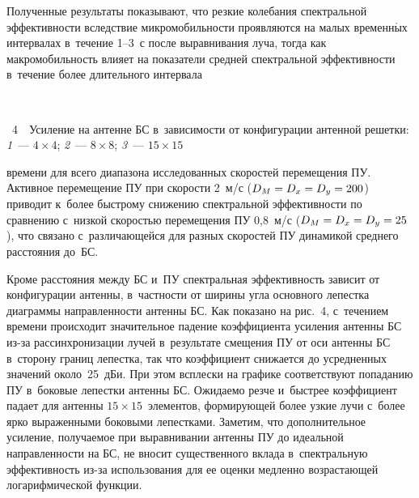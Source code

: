 \begin{multicols}{2}
  Полученные результаты показывают, что резкие колебания спектральной 
эффективности вследствие микромобильности проявляются на малых 
временн$\acute{\mbox{ы}}$х интервалах в~течение 1--3~с после выравнивания 
луча, тогда как макромобильность влияет на показатели средней спектральной 
эф\-фек\-тив\-ности в~течение более длительного интервала\linebreak\vspace*{-10pt}

{ \begin{center}  %
 \vspace*{-3pt}
    \mbox{%
\epsfxsize=77.21mm 
}

\end{center}



\noindent
{{\figurename~4}\ \ \small{Усиление на антенне БС в~зависимости от конфигурации антенной решетки: 
\textit{1}~--- $4\times 4$; \textit{2}~--- $8\times 8$; \textit{3}~--- $15\times 15$
}}}

\vspace*{6pt}

 
  
  \noindent
   времени для всего 
диапазона исследованных скоростей перемещения ПУ. Активное перемещение 
ПУ при скорости 2~м/с ($D_M\hm= D_x\hm= D_y\hm=200$) приводит к~более 
быстрому снижению спект\-раль\-ной эф\-фек\-тив\-ности по срав\-не\-нию с~низ\-кой 
ско\-ростью перемещения ПУ 0,8~м/с ($D_M\hm= D_x\hm= D_y\hm= 25$), что 
связано с~раз\-ли\-ча\-ющей\-ся для раз\-ных скоростей ПУ динамикой сред\-не\-го 
рас\-сто\-яния до~БС.
  

  
  Кроме расстояния между БС и~ПУ спектральная эффективность зависит от 
конфигурации антенны, в~частности от ширины угла основного лепестка 
диаграммы направленности антенны БС. Как показано на рис.~4, с~течением 
времени происходит значительное падение коэффициента усиления антенны БС 
из-за рассинхронизации лучей в~результате смещения ПУ от оси антенны БС 
в~сторону границ лепестка, так что коэффициент снижается до усредненных 
значений около~25~дБи. При этом всплески на графике соответствуют 
попаданию ПУ в~боковые лепестки антенны БС. Ожидаемо рез\-че и~быст\-рее 
коэффициент падает для антенны $15\times15$~элементов, фор\-ми\-ру\-ющей более 
узкие лучи с~более ярко выраженными боковыми лепестками. Заметим, что 
дополнительное усиление, по\-лу\-ча\-емое при выравнивании антенны ПУ до 
идеальной направленности на БС, не вносит существенного вклада 
в~спектральную эффективность из-за использования для ее оценки медленно 
возрастающей логарифмической функции. 
  

\end{multicols}
